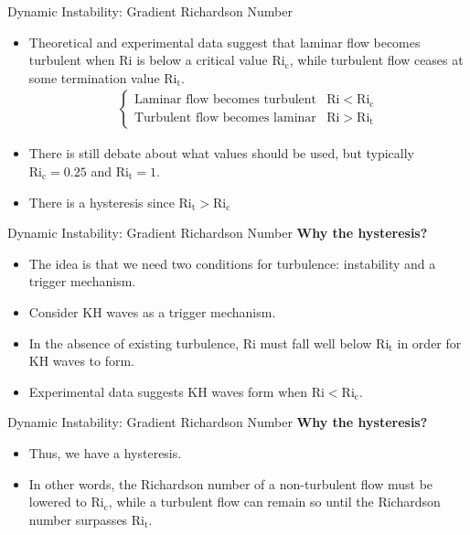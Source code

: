 \begin{frame}{Dynamic Instability: Gradient Richardson Number}
\begin{itemize}
	\item Theoretical and experimental data suggest that laminar flow becomes turbulent when $\mathrm{Ri}$ is below a critical value $\mathrm{Ri_c}$, while turbulent flow ceases at some termination value $\mathrm{Ri_t}$.
	\begin{gather*}
	\begin{cases}
	\text{Laminar flow becomes turbulent} & \mathrm{Ri}<\mathrm{Ri_c}\\
	\text{Turbulent flow becomes laminar} & \mathrm{Ri}>\mathrm{Ri_t}
	\end{cases}
	\end{gather*}
	\item There is still debate about what values should be used, but typically $\mathrm{Ri_c} = 0.25$ and $\mathrm{Ri_t} = 1$.
	\item There is a hysteresis since $\mathrm{Ri_t} > \mathrm{Ri_c}$
\end{itemize}
\end{frame}
\begin{frame}{Dynamic Instability: Gradient Richardson Number}
\textbf{Why the hysteresis?}
\begin{itemize}
	\item The idea is that we need two conditions for turbulence: instability and a trigger mechanism.
	\item Consider KH waves as a trigger mechanism.
	\item In the absence of existing turbulence, $\mathrm{Ri}$ must fall well below $\mathrm{Ri_t}$ in order for KH waves to form.
	\item Experimental data suggests KH waves form when $\mathrm{Ri}<\mathrm{Ri_c}$.
\end{itemize}
\end{frame}
\begin{frame}{Dynamic Instability: Gradient Richardson Number}
\textbf{Why the hysteresis?}
\begin{itemize}
	\item Thus, we have a hysteresis.
	\item In other words, the Richardson number of a non-turbulent flow must be lowered to $\mathrm{Ri_c}$, while a turbulent flow can remain so until the Richardson number surpasses $\mathrm{Ri_t}$.
\end{itemize}
\end{frame}
